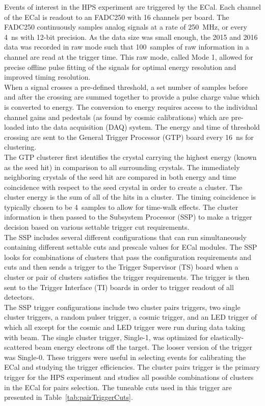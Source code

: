 Events of interest in the HPS experiment are triggered by the ECal. Each channel of the ECal is readout to an FADC250 with 16 channels per board. The FADC250 continuously samples analog signals at a rate of 250~MHz, or every 4~ns with 12-bit precision. As the data size was small enough, the 2015 and 2016 data was recorded in raw mode such that 100~samples of raw information in a channel are read at the trigger time. This raw mode, called Mode 1, allowed for precise offline pulse fitting of the signals for optimal energy resolution and improved timing resolution.\\
\indent When a signal crosses a pre-defined threshold, a set number of samples before and after the crossing are summed together to provide a pulse charge value which is converted to energy. The conversion to energy requires access to the individual channel gains and pedestals (as found by cosmic calibrations) which are pre-loaded into the data acquisition (DAQ) system. The energy and time of threshold crossing are sent to the General Trigger Processor (GTP) board every 16~ns  for clustering.~\cite{balossino_hps_2016}\\
\indent The GTP clusterer first identifies the crystal carrying the highest energy (known as the seed hit) in comparison to all surrounding crystals. The immediately neighboring crystals of the seed hit are compared in both energy and time coincidence with respect to the seed crystal in order to create a cluster. The cluster energy is the sum of all of the hits in a cluster. The timing coincidence is typically chosen to be 4~samples to allow for time-walk effects. The cluster information is then passed to the Subsystem Processor (SSP) to make a trigger decision based on various settable trigger cut requirements. \\
\indent The SSP includes several different configurations that can run simultaneously containing different settable cuts and prescale values for ECal modules. The SSP looks for combinations of clusters that pass the configuration requirements and cuts and then sends a trigger to the Trigger Supervisor (TS) board when a cluster or pair of clusters satisfies the trigger requirements. The trigger is then sent to the Trigger Interface (TI) boards in order to trigger readout of all detectors.\\ 
\indent The SSP trigger configurations include two cluster pairs triggers, two single cluster triggers, a random pulser trigger, a cosmic trigger, and an LED trigger of which all except for the cosmic and LED trigger were run during data taking with beam. The single cluster trigger, Single-1, was optimized for elastically-scattered beam energy electrons off the target. The looser version of the trigger was Single-0. These triggers were useful in selecting events for calibrating the ECal and studying the trigger efficiencies. The cluster pairs trigger is the primary trigger for the HPS experiment and studies all possible combinations of clusters in the ECal for pairs selection. The tuneable cuts used in this trigger are presented in Table~\ref{tab:pairTriggerCuts}.~\cite{balossino_hps_2016} 

